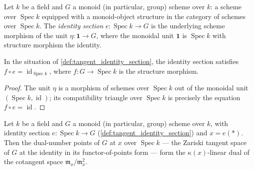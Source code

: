 \begin{definition}\leanok
  \label{def:tangent_identity_section}
  Let \(k\) be a field and \(G\) a monoid (in particular, group)
  scheme over \(k\): a scheme over \(\operatorname{Spec} k\) equipped
  with a monoid-object structure in the category of schemes over
  \(\operatorname{Spec} k\). The \emph{identity section}
  \(e : \operatorname{Spec} k \to G\) is the underlying scheme
  morphism of the unit \(\eta : \mathbf 1 \to G\), where the monoidal
  unit \(\mathbf 1\) is \(\operatorname{Spec} k\) with structure
  morphism the identity.
\end{definition}

\begin{lemma}\leanok
  \label{lem:tangent_identity_section_comp}
  In the situation of \cref{def:tangent_identity_section}, the
  identity section satisfies
  \(f \circ e = \operatorname{id}_{\operatorname{Spec} k}\), where
  \(f : G \to \operatorname{Spec} k\) is the structure morphism.
\end{lemma}

\begin{proof}\leanok
  The unit \(\eta\) is a morphism of schemes over
  \(\operatorname{Spec} k\) out of the monoidal unit
  \((\operatorname{Spec} k, \operatorname{id})\); its compatibility
  triangle over \(\operatorname{Spec} k\) is precisely the equation
  \(f \circ e = \operatorname{id}\).
\end{proof}

\begin{theorem}\leanok
  \label{thm:tangent_identity_cotangent_dual}
  Let \(k\) be a field and \(G\) a monoid (in particular, group)
  scheme over \(k\), with identity section
  \(e : \operatorname{Spec} k \to G\)
  (\cref{def:tangent_identity_section}) and \(x = e(*)\). Then the
  dual-number points of \(G\) at \(x\) over \(\operatorname{Spec} k\)
  — the Zariski tangent space of \(G\) at the identity in its
  functor-of-points form — form the \(\kappa(x)\)-linear dual of the
  cotangent space \(\mathfrak m_x/\mathfrak m_x^2\).
\end{theorem}

